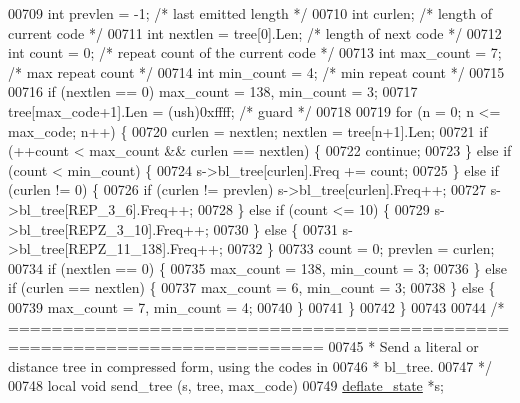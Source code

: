 \begin{DoxyCode}
{{{{{{{{{{{{{00709     \textcolor{keywordtype}{int} prevlen = -1;          \textcolor{comment}{/* last emitted length */}
00710     \textcolor{keywordtype}{int} curlen;                \textcolor{comment}{/* length of current code */}
00711     \textcolor{keywordtype}{int} nextlen = tree[0].Len; \textcolor{comment}{/* length of next code */}
00712     \textcolor{keywordtype}{int} count = 0;             \textcolor{comment}{/* repeat count of the current code */}
00713     \textcolor{keywordtype}{int} max\_count = 7;         \textcolor{comment}{/* max repeat count */}
00714     \textcolor{keywordtype}{int} min\_count = 4;         \textcolor{comment}{/* min repeat count */}
00715 
00716     \textcolor{keywordflow}{if} (nextlen == 0) max\_count = 138, min\_count = 3;
00717     tree[max\_code+1].Len = (ush)0xffff; \textcolor{comment}{/* guard */}
00718 
00719     \textcolor{keywordflow}{for} (n = 0; n <= max\_code; n++) \{
00720         curlen = nextlen; nextlen = tree[n+1].Len;
00721         \textcolor{keywordflow}{if} (++count < max\_count && curlen == nextlen) \{
00722             \textcolor{keywordflow}{continue};
00723         \} \textcolor{keywordflow}{else} \textcolor{keywordflow}{if} (count < min\_count) \{
00724             s->bl\_tree[curlen].Freq += count;
00725         \} \textcolor{keywordflow}{else} \textcolor{keywordflow}{if} (curlen != 0) \{
00726             \textcolor{keywordflow}{if} (curlen != prevlen) s->bl\_tree[curlen].Freq++;
00727             s->bl\_tree[REP\_3\_6].Freq++;
00728         \} \textcolor{keywordflow}{else} \textcolor{keywordflow}{if} (count <= 10) \{
00729             s->bl\_tree[REPZ\_3\_10].Freq++;
00730         \} \textcolor{keywordflow}{else} \{
00731             s->bl\_tree[REPZ\_11\_138].Freq++;
00732         \}
00733         count = 0; prevlen = curlen;
00734         \textcolor{keywordflow}{if} (nextlen == 0) \{
00735             max\_count = 138, min\_count = 3;
00736         \} \textcolor{keywordflow}{else} \textcolor{keywordflow}{if} (curlen == nextlen) \{
00737             max\_count = 6, min\_count = 3;
00738         \} \textcolor{keywordflow}{else} \{
00739             max\_count = 7, min\_count = 4;
00740         \}
00741     \}
00742 \}
00743 
00744 \textcolor{comment}{/* ===========================================================================}
00745 \textcolor{comment}{ * Send a literal or distance tree in compressed form, using the codes in}
00746 \textcolor{comment}{ * bl\_tree.}
00747 \textcolor{comment}{ */}
00748 local \textcolor{keywordtype}{void} send\_tree (s, tree, max\_code)
00749     \hyperlink{structinternal__state}{deflate\_state} *s;
}}}}}}}}}}}}}
\end{DoxyCode}
